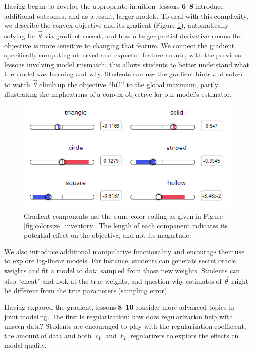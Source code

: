 \documentclass[11pt,letterpaper]{article}
\begin{document}
Having begun to develop the appropriate intuition, lessons \textbf{6}--\textbf{8} introduce 
additional outcomes, and as a result, larger models. To deal with this complexity, we describe the convex 
objective and its gradient 
(Figure \ref{fig:gradients}), 
automatically solving for $\vec{\theta}$ via gradient ascent, and how a larger partial derivative means the objective is more 
sensitive to changing that feature. We connect the gradient, specifically computing observed and expected feature 
counts, with the previous lessons involving model mismatch; this allows students to better understand what the 
model was learning and why. 
Students can use the gradient hints and solver to watch $\vec{\theta}$ climb up the objective ``hill'' to the global maximum, 
partly illustrating the implications of a convex objective for our model's estimator.

\begin{figure}[t]
\centering
\small
\includegraphics[scale=.65]{images/gradient-lesson7.PNG}
\caption{Gradient components use the same color coding as given in Figure \ref{fig:colorsize_inventory}. The length of each component indicates its potential effect on the objective, and not its magnitude.}
\label{fig:gradients}
\end{figure}

We also introduce additional manipulative functionality and encourage their use to 
explore log-linear models. For instance, students can generate secret oracle weights and 
fit a model to data sampled from those new weights. Students can also ``cheat'' and look at the true 
weights,  and question why estimates of $\vec{\theta}$ might be different from the true parameters 
(sampling error).

Having explored the gradient, lessons \textbf{8}--\textbf{10} consider more advanced topics in joint 
modeling. The first is regularization: how does regularization help with unseen data? Students are encouraged 
to play with the regularization coefficient, the amount of data and both $\ell_1$ and $\ell_2$ regularizers to 
explore the effects on model quality.
\end{document}
